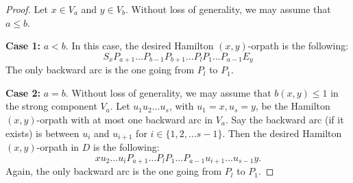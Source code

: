 \documentclass[10pt,a4paper]{amsart}
\begin{document}
\begin{proof}
Let $x \in V_a$ and $y \in V_b$.
Without loss of generality, we may assume that $a \le b$.

\textbf{Case 1:} $a<b$.
In this case, the desired Hamilton $(x,y)$-orpath is the following:
\[
S_xP_{a+1}\dots P_{b-1}P_{b+1}\dots P_lP_1 \dots P_{a-1}E_y
\]
The only backward arc is the one going from $P_l$ to $P_1$.

\textbf{Case 2:} $a=b$. %
Without loss of generality, we may assume that $b(x,y)\le 1$ in the strong component $V_a$.
Let $u_1u_2\dots u_s$, with $u_1=x, u_s=y$, be the Hamilton $(x,y)$-orpath with at most one backward arc in $V_a$.
Say the backward arc (if it exists) is between $u_i$ and $u_{i+1}$ for $i \in \{1,2,\dots s-1 \}$. 
Then the desired Hamilton $(x,y)$-orpath in $D$ is the following:
\[
xu_2\dots u_{i}P_{a+1}\dots P_lP_1 \dots P_{a-1}u_{i+1}\dots u_{s-1}y.
\]
Again, the only backward arc is the one going from $P_l$ to $P_1$.
\end{proof}   
\end{document}
